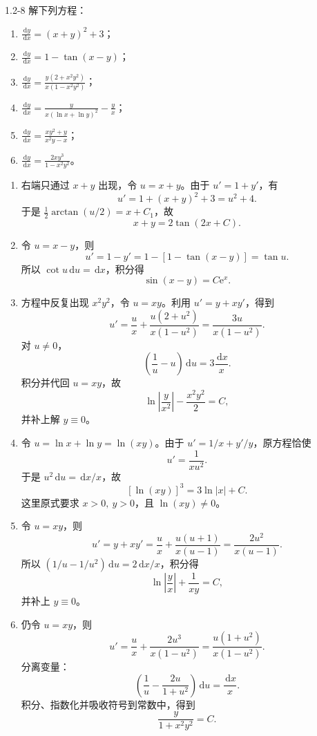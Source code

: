 \documentclass[UTF8,a4paper,11pt]{ctexart}
\newcommand{\dd}{\,\mathrm d}
\newcommand{\e}{\mathrm e}
\begin{document}
\begin{problem}{1.2-8}
解下列方程：
  \begin{enumerate}[label=(\arabic*)]
    \item $\displaystyle \frac{\dd y}{\dd x}=(x+y)^2+3$；
    \item $\displaystyle \frac{\dd y}{\dd x}=1-\tan(x-y)$；
    \item $\displaystyle \frac{\dd y}{\dd x}=\frac{y(2+x^2y^2)}{x(1-x^2y^2)}$；
    \item $\displaystyle \frac{\dd y}{\dd x}=\frac{y}{x(\ln x+\ln y)^2}-\frac{y}{x}$；
    \item $\displaystyle \frac{\dd y}{\dd x}=\frac{xy^2+y}{x^2y-x}$；
    \item $\displaystyle \frac{\dd y}{\dd x}=\frac{2xy^3}{1-x^2y^2}$。
  \end{enumerate}
\end{problem}

\begin{solution}
\begin{enumerate}[label=(\arabic*)]
\item 右端只通过 $x+y$ 出现，令 $u=x+y$。由于 $u'=1+y'$，有
\[
u'=1+(x+y)^2+3=u^2+4.
\]
于是 $\frac12\arctan(u/2)=x+C_1$，故
\[
\boxed{x+y=2\tan(2x+C)}.
\]
\item 令 $u=x-y$，则
\[
u'=1-y'=1-[1-\tan(x-y)]=\tan u.
\]
所以 $\cot u\dd u=\dd x$，积分得
\[
\boxed{\sin(x-y)=C\e^x}.
\]
\item 方程中反复出现 $x^2y^2$，令 $u=xy$。利用 $u'=y+xy'$，得到
\[
u'=\frac ux+\frac{u(2+u^2)}{x(1-u^2)}
=\frac{3u}{x(1-u^2)}.
\]
对 $u\ne0$，
\[
\left(\frac1u-u\right)\dd u=3\frac{\dd x}{x}.
\]
积分并代回 $u=xy$，故
\[
\boxed{\ln\left|\frac{y}{x^2}\right|-\frac{x^2y^2}{2}=C},
\]
并补上解 $y\equiv0$。
\item 令 $u=\ln x+\ln y=\ln(xy)$。由于 $u'=1/x+y'/y$，原方程恰使
\[
u'=\frac1{x u^2}.
\]
于是 $u^2\dd u=\dd x/x$，故
\[
\boxed{[\ln(xy)]^3=3\ln|x|+C}.
\]
这里原式要求 $x>0,\ y>0$，且 $\ln(xy)\ne0$。
\item 令 $u=xy$，则
\[
u'=y+xy'=\frac ux+\frac{u(u+1)}{x(u-1)}
=\frac{2u^2}{x(u-1)}.
\]
所以 $(1/u-1/u^2)\dd u=2\dd x/x$，积分得
\[
\boxed{\ln\left|\frac yx\right|+\frac1{xy}=C},
\]
并补上 $y\equiv0$。
\item 仍令 $u=xy$，则
\[
u'=\frac ux+\frac{2u^3}{x(1-u^2)}
=\frac{u(1+u^2)}{x(1-u^2)}.
\]
分离变量：
\[
\left(\frac1u-\frac{2u}{1+u^2}\right)\dd u=\frac{\dd x}{x}.
\]
积分、指数化并吸收符号到常数中，得到
\[
\boxed{\frac{y}{1+x^2y^2}=C}.
\]
\end{enumerate}
\end{solution}
\end{document}
